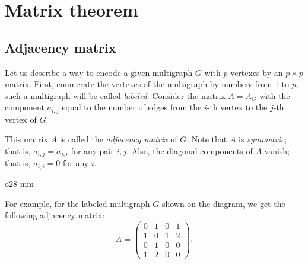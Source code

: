 \chapter{Matrix theorem}


\section*{Adjacency matrix}

Let us describe a way to encode a given multigraph $G$ with $p$ vertexes by an $p{\times}p$ matrix.
First, enumerate the vertexes of the multigraph by numbers from $1$ to $p$;
such a multigraph will be called \emph{labeled}. 
Consider the matrix $A=A_G$ with the component $a_{i,j}$ equal to the number of edges from the $i$-th vertex to the $j$-th vertex of $G$.

This matrix $A$ is called the \emph{adjacency matrix} of $G$.
Note that $A$ is \emph{symmetric}; that is, $a_{i,j}=a_{j,i}$ for any pair $i,j$.
Also, the diagonal components of $A$ vanish; that is, $a_{i,i}=0$ for any $i$.

{

\begin{wrapfigure}{o}{28 mm}
\end{wrapfigure}


For example, for the labeled multigraph $G$ shown on the diagram, we get the following adjacency matrix:
\[A=\left(
\begin{matrix}
0&1&0&1
\\
1&0&1&2
\\
0&1&0&0
\\
1&2&0&0
\end{matrix}
\right).\]

}

